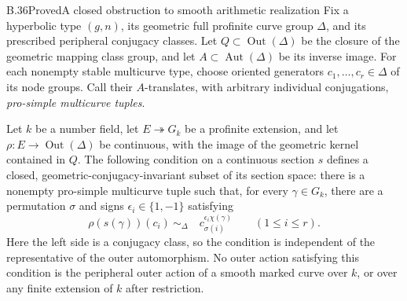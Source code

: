 \begin{statement}{B.36}{Proved}{A closed obstruction to smooth arithmetic realization}
Fix a hyperbolic type $(g,n)$, its geometric full profinite
curve group $\Delta$, and its prescribed peripheral conjugacy
classes. Let $Q\subset\operatorname{Out}(\Delta)$ be the closure
of the geometric mapping class group, and let
$A\subset\operatorname{Aut}(\Delta)$ be its inverse image.
For each nonempty stable multicurve type, choose oriented
generators $c_1,\ldots,c_r\in\Delta$ of its node groups. Call
their $A$-translates, with arbitrary individual conjugations,
\emph{pro-simple multicurve tuples}.

Let $k$ be a number field, let $E\twoheadrightarrow G_k$ be a
profinite extension, and let
$\rho:E\to\operatorname{Out}(\Delta)$ be continuous, with the
image of the geometric kernel contained in $Q$. The following
condition on a continuous section $s$ defines a closed,
geometric-conjugacy-invariant subset of its section space:
there is a nonempty pro-simple multicurve tuple such that,
for every $\gamma\in G_k$, there are a permutation $\sigma$
and signs $\epsilon_i\in\{1,-1\}$ satisfying
\[
 \rho(s(\gamma))(c_i)
 \ \sim_\Delta\quad
 c_{\sigma(i)}^{\epsilon_i\chi(\gamma)}
 \qquad(1\leq i\leq r).
 \tag{B.36.1}
\]
Here the left side is a conjugacy class, so the condition is
independent of the representative of the outer automorphism.
No outer action satisfying this condition is the peripheral
outer action of a smooth marked curve over $k$, or over any
finite extension of $k$ after restriction.
\end{statement}
